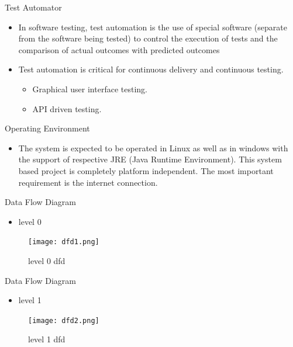 \documentclass{beamer}
\begin{document}
\begin{frame}{Test Automator}
\begin{itemize}
\item  In software testing, test automation is the use of special software (separate from the
software being tested) to control the execution of tests and the comparison of actual outcomes with predicted outcomes
\vspace{0.5 cm}
\item Test automation is critical for continuous
delivery and continuous testing.
\vspace{0.5 cm}
\begin{itemize}
\item  Graphical user interface testing.
\item API driven testing.
\end{itemize}
\end{itemize}
\end{frame}

\begin{frame}{Operating Environment}
\begin{itemize}
\item The system is expected to be operated in Linux as well as in windows with the support of
respective JRE (Java Runtime Environment). This system based project is completely platform
independent. The most important requirement is the internet connection.
\end{itemize}
\end{frame}


\begin{frame}{Data Flow Diagram}
\begin{itemize}
\item level 0
\end{itemize}
\begin{figure}[h]
\begin{center}
\texttt{[image: dfd1.png]}
\caption{level 0 dfd}
\end{center}
\end{figure}
\end{frame}

\begin{frame}{Data Flow Diagram}
\begin{itemize}
\item level 1
\end{itemize}
\begin{figure}[h]
\begin{center}
\texttt{[image: dfd2.png]}
\caption{level 1 dfd}
\end{center}
\end{figure}
\end{frame}
\end{document}
